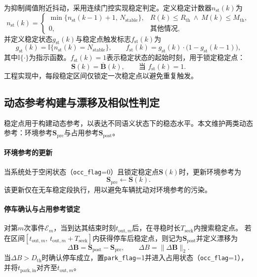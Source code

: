 \documentclass{xdupgthesis}
\begin{document}
为抑制阈值附近抖动，采用连续门控实现稳定判定。定义稳定计数器$n_{\mathrm{st}}(k)$为
\begin{equation}
n_{\mathrm{st}}(k)=
\begin{cases}
\min\{n_{\mathrm{st}}(k-1)+1,\,N_{\mathrm{stable}}\}, & R(k)\le R_{\mathrm{th}}\ \land\ M(k)\le M_{\mathrm{th}},\\
0, & \text{其他情况},
\end{cases}
\label{eq:ch4_nst}
\end{equation}
并定义稳定状态$g_{\mathrm{st}}(k)$与稳定点触发标志$f_{\mathrm{st}}(k)$为
\begin{equation}
g_{\mathrm{st}}(k)=\mathbb{I}\{n_{\mathrm{st}}(k)=N_{\mathrm{stable}}\},\qquad
f_{\mathrm{st}}(k)=g_{\mathrm{st}}(k)\cdot \bigl(1-g_{\mathrm{st}}(k-1)\bigr),
\label{eq:ch4_stable_flag}
\end{equation}
其中$\mathbb{I}\{\cdot\}$为指示函数。$f_{\mathrm{st}}(k)=1$表示稳定状态的起始时刻，用于锁定稳定点：
\begin{equation}
\mathbf{S}(k)=\overline{\mathbf{B}}(k),\qquad \text{当 } f_{\mathrm{st}}(k)=1.
\label{eq:ch4_S_lock}
\end{equation}
工程实现中，每段稳定区间仅锁定一次稳定点以避免重复触发。

\subsection{动态参考构建与漂移及相似性判定}
\label{subsec:ch4_ref}

稳定点用于构建动态参考，以表达不同语义状态下的稳态水平。本文维护两类动态参考：环境参考$\mathbf{S}_{\mathrm{pre}}$与占用参考$\mathbf{S}_{\mathrm{post}}$。

\paragraph{环境参考的更新}
当系统处于空闲状态（\texttt{occ\_flag}=0）且锁定稳定点$\mathbf{S}(k)$时，更新环境参考为
\begin{equation}
\mathbf{S}_{\mathrm{pre}}\leftarrow \mathbf{S}(k).
\label{eq:ch4_pre_update}
\end{equation}
该更新仅在无车稳定段执行，用以避免车辆扰动对环境参考的污染。

\paragraph{停车确认与占用参考锁定}
对第$m$次事件$\mathcal{E}_m$，当到达其结束时刻$t_{\mathrm{out},m}$后，在寻稳时长$T_{\mathrm{seek}}$内搜索稳定点。
若在区间$[t_{\mathrm{out},m},\,t_{\mathrm{out},m}+T_{\mathrm{seek}}]$内获得停车后稳定点，则记为$\mathbf{S}_{\mathrm{post}}$并定义漂移为
\begin{equation}
\Delta\mathbf{B}=\mathbf{S}_{\mathrm{post}}-\mathbf{S}_{\mathrm{pre}},\qquad
\Delta B=\lVert\Delta\mathbf{B}\rVert_2.
\label{eq:ch4_drift}
\end{equation}
当$\Delta B>D_{\mathrm{th}}$时确认停车成立，置\texttt{park\_flag}=1并进入占用状态（\texttt{occ\_flag}=1），
并将$t_{\mathrm{park,in}}$对齐至$t_{\mathrm{out},m}$。
\end{document}
